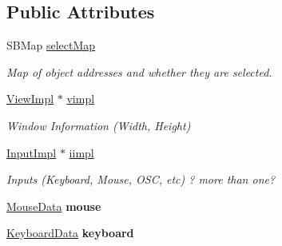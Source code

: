 \subsection*{Public Attributes}
\begin{DoxyCompactItemize}
\item 
\hypertarget{classvsr_1_1_interface_a6fea0d001ec2136729849239faf962aa}{S\-B\-Map \hyperlink{classvsr_1_1_interface_a6fea0d001ec2136729849239faf962aa}{select\-Map}}\label{classvsr_1_1_interface_a6fea0d001ec2136729849239faf962aa}

\begin{DoxyCompactList}\small\item\em Map of object addresses and whether they are selected. \end{DoxyCompactList}\item 
\hypertarget{classvsr_1_1_interface_ac1bdc62a5b087a0a859127333cb17b8b}{\hyperlink{structvsr_1_1_interface_1_1_view_impl}{View\-Impl} $\ast$ \hyperlink{classvsr_1_1_interface_ac1bdc62a5b087a0a859127333cb17b8b}{vimpl}}\label{classvsr_1_1_interface_ac1bdc62a5b087a0a859127333cb17b8b}

\begin{DoxyCompactList}\small\item\em Window Information (Width, Height) \end{DoxyCompactList}\item 
\hypertarget{classvsr_1_1_interface_addc2fbc819b39bf508fbd0b3c8130c08}{\hyperlink{structvsr_1_1_interface_1_1_input_impl}{Input\-Impl} $\ast$ \hyperlink{classvsr_1_1_interface_addc2fbc819b39bf508fbd0b3c8130c08}{iimpl}}\label{classvsr_1_1_interface_addc2fbc819b39bf508fbd0b3c8130c08}

\begin{DoxyCompactList}\small\item\em Inputs (Keyboard, Mouse, O\-S\-C, etc) ? more than one? \end{DoxyCompactList}\item 
\hypertarget{classvsr_1_1_interface_a067674162a9e09b8dd2bb0675a06a191}{\hyperlink{structvsr_1_1_mouse_data}{Mouse\-Data} {\bfseries mouse}}\label{classvsr_1_1_interface_a067674162a9e09b8dd2bb0675a06a191}

\item 
\hypertarget{classvsr_1_1_interface_a2c720a632844c5f843954566af173eef}{\hyperlink{structvsr_1_1_keyboard_data}{Keyboard\-Data} {\bfseries keyboard}}\label{classvsr_1_1_interface_a2c720a632844c5f843954566af173eef}

\end{DoxyCompactItemize}


